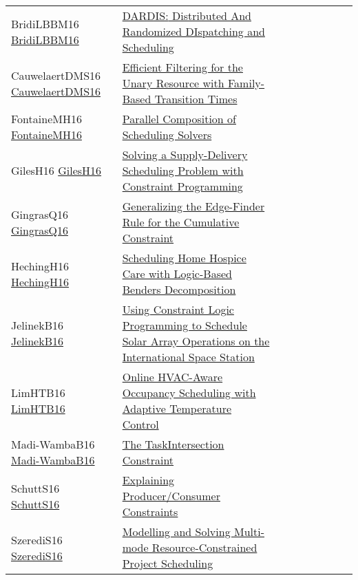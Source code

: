 {\begin{longtable}{p{3cm}p{7cm}lllllll}
BridiLBBM16 \href{https://doi.org/10.3233/978-1-61499-672-9-1598}{BridiLBBM16} &  \href{papers/BridiLBBM16.pdf}{{DARDIS:} Distributed And Randomized DIspatching and Scheduling} &  &  &  &  &  &  & \\
CauwelaertDMS16 \href{https://doi.org/10.1007/978-3-319-44953-1\_33}{CauwelaertDMS16} &  \href{papers/CauwelaertDMS16.pdf}{Efficient Filtering for the Unary Resource with Family-Based Transition Times} &  &  &  &  &  &  & \\
FontaineMH16 \href{https://doi.org/10.1007/978-3-319-33954-2\_12}{FontaineMH16} &  \href{papers/FontaineMH16.pdf}{Parallel Composition of Scheduling Solvers} &  &  &  &  &  &  & \\
GilesH16 \href{https://doi.org/10.1007/978-3-319-44953-1\_38}{GilesH16} &  \href{papers/GilesH16.pdf}{Solving a Supply-Delivery Scheduling Problem with Constraint Programming} &  &  &  &  &  &  & \\
GingrasQ16 \href{http://www.ijcai.org/Abstract/16/440}{GingrasQ16} &  \href{papers/GingrasQ16.pdf}{Generalizing the Edge-Finder Rule for the Cumulative Constraint} &  &  &  &  &  &  & \\
HechingH16 \href{https://doi.org/10.1007/978-3-319-33954-2\_14}{HechingH16} &  \href{papers/HechingH16.pdf}{Scheduling Home Hospice Care with Logic-Based Benders Decomposition} &  &  &  &  &  &  & \\
JelinekB16 \href{https://doi.org/10.1007/978-3-319-28228-2\_1}{JelinekB16} &  \href{papers/JelinekB16.pdf}{Using Constraint Logic Programming to Schedule Solar Array Operations on the International Space Station} &  &  &  &  &  &  & \\
LimHTB16 \href{https://doi.org/10.1007/978-3-319-44953-1\_43}{LimHTB16} &  \href{papers/LimHTB16.pdf}{Online HVAC-Aware Occupancy Scheduling with Adaptive Temperature Control} &  &  &  &  &  &  & \\
Madi-WambaB16 \href{https://doi.org/10.1007/978-3-319-33954-2\_18}{Madi-WambaB16} &  \href{papers/Madi-WambaB16.pdf}{The TaskIntersection Constraint} &  &  &  &  &  &  & \\
SchuttS16 \href{https://doi.org/10.1007/978-3-319-44953-1\_28}{SchuttS16} &  \href{papers/SchuttS16.pdf}{Explaining Producer/Consumer Constraints} &  &  &  &  &  &  & \\
SzerediS16 \href{https://doi.org/10.1007/978-3-319-44953-1\_31}{SzerediS16} &  \href{papers/SzerediS16.pdf}{Modelling and Solving Multi-mode Resource-Constrained Project Scheduling} &  &  &  &  &  &  & \\

\end{longtable}}
